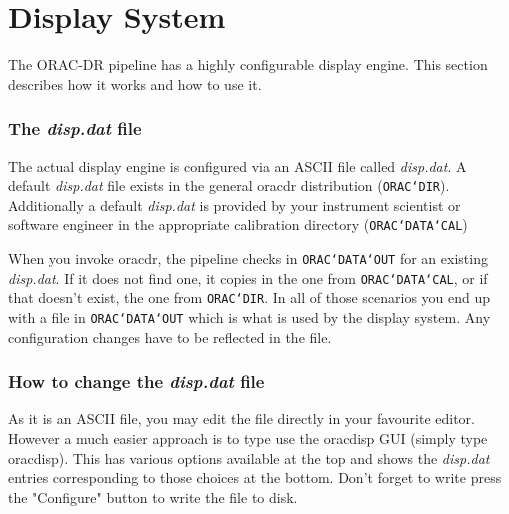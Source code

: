 \documentclass[twoside,11pt]{article}
\newcommand{\underscore}{\leavevmode\kern.04em\vbox{\hrule width 0.4em height 0.3pt}}
\newcommand{\xlabel}[1]{}
\renewcommand{\_}{\texttt{\symbol{95}}}
\begin{document}

\section{Display System\xlabel{display_system}}%

The ORAC-DR pipeline has a highly configurable display engine. This
section describes how it works and how to use it.

\subsubsection*{The {\em disp.dat\/} file}%

The actual display engine is configured via an ASCII file called
{\em disp.dat\/}. A default {\em disp.dat\/} file exists in the general oracdr
distribution ({\tt ORAC\char`\_DIR}). Additionally a default {\em disp.dat\/} is provided
by your instrument scientist or software engineer in the appropriate
calibration directory ({\tt ORAC\char`\_DATA\char`\_CAL})

When you invoke oracdr, the pipeline checks in {\tt ORAC\char`\_DATA\char`\_OUT} for an
existing {\em disp.dat\/}. If it does not find one, it copies in the one from
{\tt ORAC\char`\_DATA\char`\_CAL}, or if that doesn't exist, the one from {\tt ORAC\char`\_DIR}. In
all of those scenarios you end up with a file in {\tt ORAC\char`\_DATA\char`\_OUT} which
is what is used by the display system. Any configuration changes have
to be reflected in the file.

\subsubsection*{How to change the {\em disp.dat\/} file}%

As it is an ASCII file, you may edit the file directly in your
favourite editor. However a much easier approach is to type use the
oracdisp GUI (simply type oracdisp). This has various options
available at the top and shows the {\em disp.dat\/} entries corresponding to
those choices at the bottom. Don't forget to write press the
"Configure" button to write the file to disk. 
\end{document}
